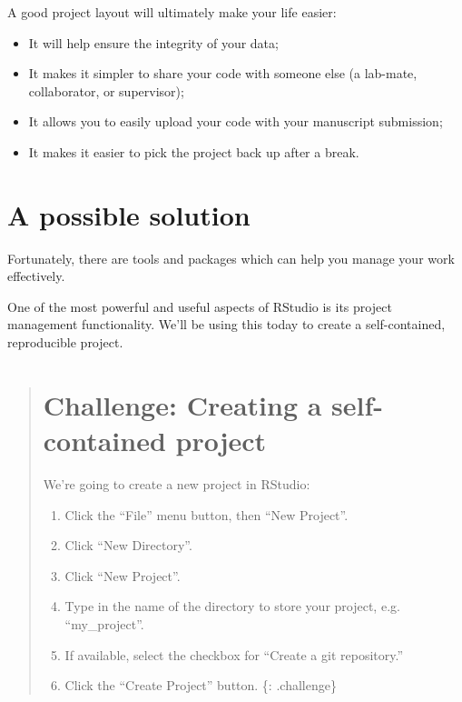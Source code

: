 \documentclass[]{book}
\providecommand{\tightlist}{%
  \setlength{\itemsep}{0pt}\setlength{\parskip}{0pt}}
\begin{document}
A good project layout will ultimately make your life easier:

\begin{itemize}
\tightlist
\item
  It will help ensure the integrity of your data;
\item
  It makes it simpler to share your code with someone else (a lab-mate,
  collaborator, or supervisor);
\item
  It allows you to easily upload your code with your manuscript
  submission;
\item
  It makes it easier to pick the project back up after a break.
\end{itemize}

\section{A possible solution}\label{a-possible-solution}

Fortunately, there are tools and packages which can help you manage your
work effectively.

One of the most powerful and useful aspects of RStudio is its project
management functionality. We'll be using this today to create a
self-contained, reproducible project.

\begin{quote}
\section{Challenge: Creating a self-contained
project}\label{challenge-creating-a-self-contained-project}

We're going to create a new project in RStudio:

\begin{enumerate}
\def\labelenumi{\arabic{enumi}.}
\tightlist
\item
  Click the ``File'' menu button, then ``New Project''.
\item
  Click ``New Directory''.
\item
  Click ``New Project''.
\item
  Type in the name of the directory to store your project, e.g.
  ``my\_project''.
\item
  If available, select the checkbox for ``Create a git repository.''
\item
  Click the ``Create Project'' button. \{: .challenge\}
\end{enumerate}
\end{quote}
\end{document}
